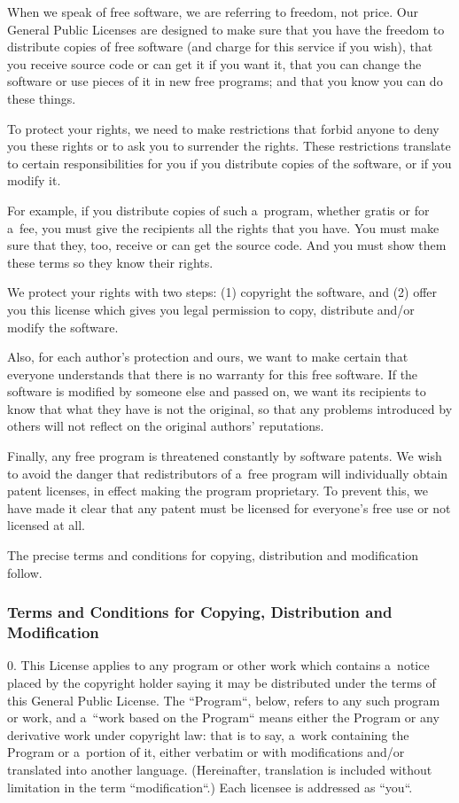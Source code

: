 \documentclass[a4paper, 11pt, twoside]{article}
\begin{document}
When we speak of free software, we are referring to freedom, not price. Our General Public Licenses are designed to make sure that you have the freedom to distribute copies of free software (and charge for this service if you wish), that you receive source code or can get it if you want it, that you can change the software or use pieces of it in new free programs; and that you know you can do these things.

To protect your rights, we need to make restrictions that forbid anyone to deny you these rights or to ask you to surrender the rights. These restrictions translate to certain responsibilities for you if you distribute copies of the software, or if you modify it.

For example, if you distribute copies of such a~program, whether gratis or for a~fee, you must give the recipients all the rights that you have. You must make sure that they, too, receive or can get the source code. And you must show them these terms so they know their rights.

We protect your rights with two steps: (1) copyright the software, and (2) offer you this license which gives you legal permission to copy, distribute and/or modify the software.

Also, for each author's protection and ours, we want to make certain that everyone understands that there is no warranty for this free software. If the software is modified by someone else and passed on, we want its recipients to know that what they have is not the original, so that any problems introduced by others will not reflect on the original authors' reputations.

Finally, any free program is threatened constantly by software patents. We wish to avoid the danger that redistributors of a~free program will individually obtain patent licenses, in effect making the program proprietary. To prevent this, we have made it clear that any patent must be licensed for everyone's free use or not licensed at all.

The precise terms and conditions for copying, distribution and modification follow.

\subsubsection{Terms and Conditions for Copying, Distribution and Modification}

0. This License applies to any program or other work which contains a~notice placed by the copyright holder saying it may be distributed under the terms of this General Public License. The “Program“, below, refers to any such program or work, and a~“work based on the Program“ means either the Program or any derivative work under copyright law: that is to say, a~work containing the Program or a~portion of it, either verbatim or with modifications and/or translated into another language. (Hereinafter, translation is included without limitation in the term “modification“.) Each licensee is addressed as “you“.
\end{document}
